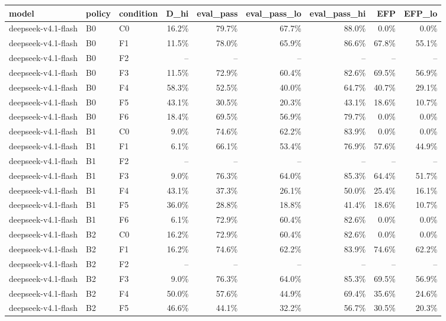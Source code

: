 \begin{tabular}{lllrrrrrr}
\toprule
model & policy & condition & D\_hi & eval\_pass & eval\_pass\_lo & eval\_pass\_hi & EFP & EFP\_lo \\
\midrule
deepseek-v4.1-flash & B0 & C0 & 16.2\% & 79.7\% & 67.7\% & 88.0\% & 0.0\% & 0.0\% \\
deepseek-v4.1-flash & B0 & F1 & 11.5\% & 78.0\% & 65.9\% & 86.6\% & 67.8\% & 55.1\% \\
deepseek-v4.1-flash & B0 & F2 & -- & -- & -- & -- & -- & -- \\
deepseek-v4.1-flash & B0 & F3 & 11.5\% & 72.9\% & 60.4\% & 82.6\% & 69.5\% & 56.9\% \\
deepseek-v4.1-flash & B0 & F4 & 58.3\% & 52.5\% & 40.0\% & 64.7\% & 40.7\% & 29.1\% \\
deepseek-v4.1-flash & B0 & F5 & 43.1\% & 30.5\% & 20.3\% & 43.1\% & 18.6\% & 10.7\% \\
deepseek-v4.1-flash & B0 & F6 & 18.4\% & 69.5\% & 56.9\% & 79.7\% & 0.0\% & 0.0\% \\
deepseek-v4.1-flash & B1 & C0 & 9.0\% & 74.6\% & 62.2\% & 83.9\% & 0.0\% & 0.0\% \\
deepseek-v4.1-flash & B1 & F1 & 6.1\% & 66.1\% & 53.4\% & 76.9\% & 57.6\% & 44.9\% \\
deepseek-v4.1-flash & B1 & F2 & -- & -- & -- & -- & -- & -- \\
deepseek-v4.1-flash & B1 & F3 & 9.0\% & 76.3\% & 64.0\% & 85.3\% & 64.4\% & 51.7\% \\
deepseek-v4.1-flash & B1 & F4 & 43.1\% & 37.3\% & 26.1\% & 50.0\% & 25.4\% & 16.1\% \\
deepseek-v4.1-flash & B1 & F5 & 36.0\% & 28.8\% & 18.8\% & 41.4\% & 18.6\% & 10.7\% \\
deepseek-v4.1-flash & B1 & F6 & 6.1\% & 72.9\% & 60.4\% & 82.6\% & 0.0\% & 0.0\% \\
deepseek-v4.1-flash & B2 & C0 & 16.2\% & 72.9\% & 60.4\% & 82.6\% & 0.0\% & 0.0\% \\
deepseek-v4.1-flash & B2 & F1 & 16.2\% & 74.6\% & 62.2\% & 83.9\% & 74.6\% & 62.2\% \\
deepseek-v4.1-flash & B2 & F2 & -- & -- & -- & -- & -- & -- \\
deepseek-v4.1-flash & B2 & F3 & 9.0\% & 76.3\% & 64.0\% & 85.3\% & 69.5\% & 56.9\% \\
deepseek-v4.1-flash & B2 & F4 & 50.0\% & 57.6\% & 44.9\% & 69.4\% & 35.6\% & 24.6\% \\
deepseek-v4.1-flash & B2 & F5 & 46.6\% & 44.1\% & 32.2\% & 56.7\% & 30.5\% & 20.3\% \\

\end{tabular}
